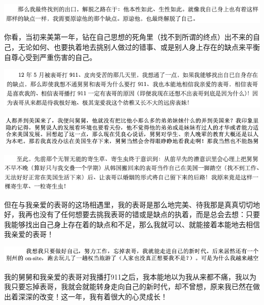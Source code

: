 \documentclass[9pt, b5paper]{article}
\begin{document}
\begin{center}
\includegraphics[width=.9\linewidth]{./pic/backups_plans_20210424_091759.png}
\end{center}

你看，当初来美第一年，钻在自己思想的死角里（找不到所谓的终点）出不来的自己，无论如何、也要执着地去挑别人做过的错事、或是别人身上存在的缺点来平衡自尊心受到严重伤害的自己。

\begin{center}
\includegraphics[width=.9\linewidth]{./pic/backups_plans_20210424_085705.png}
\end{center}

\begin{center}
\includegraphics[width=.9\linewidth]{./pic/backups_plans_20210424_091947.png}
\end{center}

\begin{center}
\includegraphics[width=.9\linewidth]{./pic/backups_plans_20210424_091855.png}
\end{center}

但在与我亲爱的表哥的这场相遇里，我的表哥是那么地完美、待我那是真真切切地好，我再也没有了任何想要去挑我表哥的错或是缺点的执着，而是总会去想：只要我能够找出自己身上存在着的缺点和不足，那么我就可以、就能接着本能地去相信我亲爱的表哥！

\begin{center}
\includegraphics[width=.9\linewidth]{./pic/backups_plans_20210424_090155.png}
\end{center}

我的舅舅和我亲爱的表哥对我播打911之后，我本能地以为我从来都不痛，我以为我只要忘掉表哥，我就会就能转身走向自己的新时代，却不曾想，原来我已然在做出着深深的改变！这一年，我有着很大的心灵成长！
\end{document}
